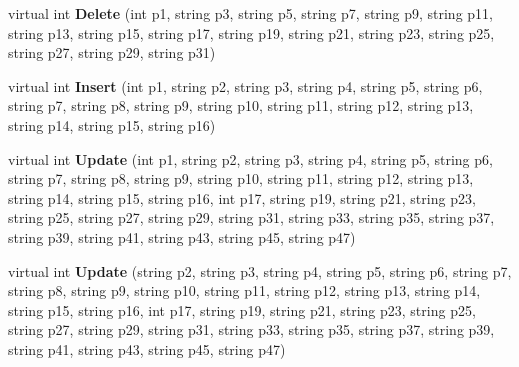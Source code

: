 \begin{DoxyCompactItemize}
\item 
virtual int {\bfseries Delete} (int p1, string p3, string p5, string p7, string p9, string p11, string p13, string p15, string p17, string p19, string p21, string p23, string p25, string p27, string p29, string p31)\hypertarget{class_products_1_1_data_1_1ds_sage_table_adapters_1_1ta_preset_a0783a1f37a5d5cee7c7e968d64009662}{}\label{class_products_1_1_data_1_1ds_sage_table_adapters_1_1ta_preset_a0783a1f37a5d5cee7c7e968d64009662}

\item 
virtual int {\bfseries Insert} (int p1, string p2, string p3, string p4, string p5, string p6, string p7, string p8, string p9, string p10, string p11, string p12, string p13, string p14, string p15, string p16)\hypertarget{class_products_1_1_data_1_1ds_sage_table_adapters_1_1ta_preset_aab472b3794aad2989e8bc0c64ada226c}{}\label{class_products_1_1_data_1_1ds_sage_table_adapters_1_1ta_preset_aab472b3794aad2989e8bc0c64ada226c}

\item 
virtual int {\bfseries Update} (int p1, string p2, string p3, string p4, string p5, string p6, string p7, string p8, string p9, string p10, string p11, string p12, string p13, string p14, string p15, string p16, int p17, string p19, string p21, string p23, string p25, string p27, string p29, string p31, string p33, string p35, string p37, string p39, string p41, string p43, string p45, string p47)\hypertarget{class_products_1_1_data_1_1ds_sage_table_adapters_1_1ta_preset_a617fdcba16f2806d34817b25dbaf520a}{}\label{class_products_1_1_data_1_1ds_sage_table_adapters_1_1ta_preset_a617fdcba16f2806d34817b25dbaf520a}

\item 
virtual int {\bfseries Update} (string p2, string p3, string p4, string p5, string p6, string p7, string p8, string p9, string p10, string p11, string p12, string p13, string p14, string p15, string p16, int p17, string p19, string p21, string p23, string p25, string p27, string p29, string p31, string p33, string p35, string p37, string p39, string p41, string p43, string p45, string p47)\hypertarget{class_products_1_1_data_1_1ds_sage_table_adapters_1_1ta_preset_a71e1d219b9e59eafb02f03f0c2af1ae6}{}\label{class_products_1_1_data_1_1ds_sage_table_adapters_1_1ta_preset_a71e1d219b9e59eafb02f03f0c2af1ae6}

\end{DoxyCompactItemize}
